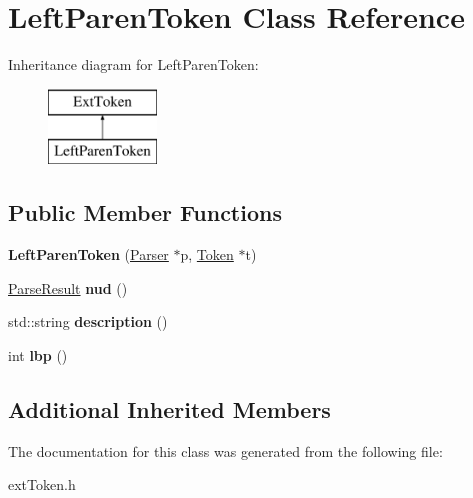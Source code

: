 \hypertarget{class_left_paren_token}{}\section{Left\+Paren\+Token Class Reference}
\label{class_left_paren_token}
Inheritance diagram for Left\+Paren\+Token\+:\begin{figure}[H]
\begin{center}
\leavevmode
\includegraphics[height=2.000000cm]{class_left_paren_token}
\end{center}
\end{figure}
\subsection*{Public Member Functions}
\begin{DoxyCompactItemize}
\item 
\hypertarget{class_left_paren_token_aecdc6faf48a1a7192ec55712f0264cba}{}{\bfseries Left\+Paren\+Token} (\hyperlink{class_parser}{Parser} $\ast$p, \hyperlink{class_token}{Token} $\ast$t)\label{class_left_paren_token_aecdc6faf48a1a7192ec55712f0264cba}

\item 
\hypertarget{class_left_paren_token_a3cb3ae9ab2647e5534c85529d314f08b}{}\hyperlink{class_parse_result}{Parse\+Result} {\bfseries nud} ()\label{class_left_paren_token_a3cb3ae9ab2647e5534c85529d314f08b}

\item 
\hypertarget{class_left_paren_token_a2df35684bd2081c3bdfe2357946917bc}{}std\+::string {\bfseries description} ()\label{class_left_paren_token_a2df35684bd2081c3bdfe2357946917bc}

\item 
\hypertarget{class_left_paren_token_afa1b94645278f097bb097d3b24445d14}{}int {\bfseries lbp} ()\label{class_left_paren_token_afa1b94645278f097bb097d3b24445d14}

\end{DoxyCompactItemize}
\subsection*{Additional Inherited Members}


The documentation for this class was generated from the following file\+:\begin{DoxyCompactItemize}
\item 
ext\+Token.\+h\end{DoxyCompactItemize}

